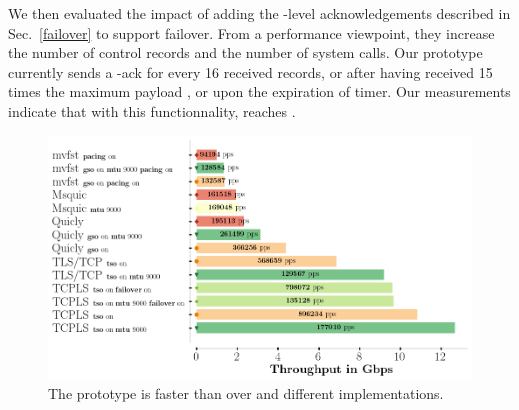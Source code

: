 
We then evaluated the impact of adding the \tcpls-level acknowledgements
described in Sec.~\ref{failover} to support failover.
From a performance viewpoint, they increase the number of control records and the number of system calls. Our prototype currently sends a \tcpls-ack for every 16 received records, or after having received 15 times the maximum \tls payload , or upon the expiration of  timer. Our measurements indicate that with this functionnality, \tcpls reaches .


\begin{figure}[!t]
  \begin{center}
    \includegraphics[width=\columnwidth]{figures/perf_analysis.png}
  \end{center}
  \caption{The \tcpls prototype is faster than \tls over \tcp and different \quic implementations.}
  \label{fig:perf}
\end{figure}



